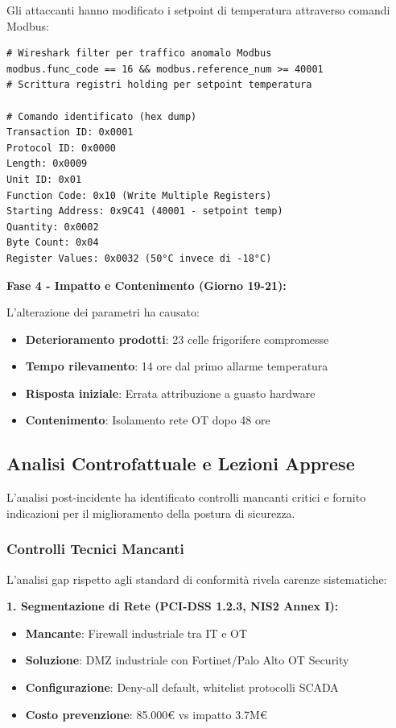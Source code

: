 Gli attaccanti hanno modificato i setpoint di temperatura attraverso comandi Modbus:
\begin{lstlisting}[caption={Ricostruzione Comandi Modbus Malevoli},label={lst:modbus_attack}]
# Wireshark filter per traffico anomalo Modbus
modbus.func_code == 16 && modbus.reference_num >= 40001
# Scrittura registri holding per setpoint temperatura

# Comando identificato (hex dump)
Transaction ID: 0x0001
Protocol ID: 0x0000
Length: 0x0009
Unit ID: 0x01
Function Code: 0x10 (Write Multiple Registers)
Starting Address: 0x9C41 (40001 - setpoint temp)
Quantity: 0x0002
Byte Count: 0x04
Register Values: 0x0032 (50°C invece di -18°C)
\end{lstlisting}

\textbf{Fase 4 - Impatto e Contenimento (Giorno 19-21):}

L'alterazione dei parametri ha causato:
\begin{itemize}
    \item \textbf{Deterioramento prodotti}: 23 celle frigorifere compromesse
    \item \textbf{Tempo rilevamento}: 14 ore dal primo allarme temperatura
    \item \textbf{Risposta iniziale}: Errata attribuzione a guasto hardware
    \item \textbf{Contenimento}: Isolamento rete OT dopo 48 ore
\end{itemize}

\subsection{Analisi Controfattuale e Lezioni Apprese}

L'analisi post-incidente ha identificato controlli mancanti critici e fornito indicazioni per il miglioramento della postura di sicurezza\autocite{Pearl2018}.

\subsubsection{Controlli Tecnici Mancanti}

L'analisi gap rispetto agli standard di conformità rivela carenze sistematiche:

\textbf{1. Segmentazione di Rete (PCI-DSS 1.2.3, NIS2 Annex I):}
\begin{itemize}
    \item \textbf{Mancante}: Firewall industriale tra IT e OT
    \item \textbf{Soluzione}: DMZ industriale con Fortinet/Palo Alto OT Security
    \item \textbf{Configurazione}: Deny-all default, whitelist protocolli SCADA
    \item \textbf{Costo prevenzione}: 85.000€ vs impatto 3.7M€
\end{itemize}

